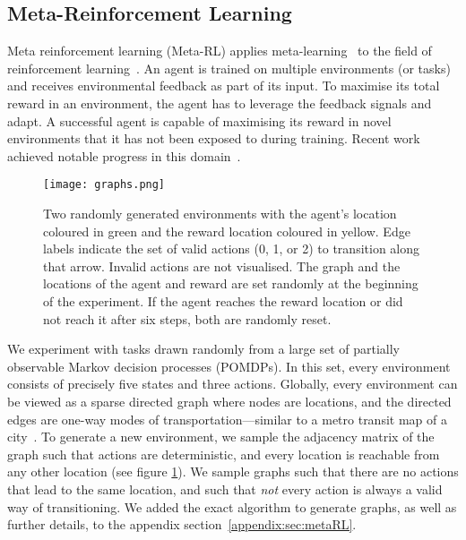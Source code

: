 \documentclass{article} \usepackage{iclr2021_conference,times}
\begin{document}
\subsection{Meta-Reinforcement Learning}
\label{subsec:metaRL}
Meta reinforcement learning (Meta-RL) applies meta-learning~\citep{schmidhuber87,Hochreiter:01meta,finn2017model} to the field of reinforcement learning~\citep{Schmidhuber:94selfold}.
An agent is trained on multiple environments (or tasks) and receives environmental feedback as part of its input. 
To maximise its total reward in an environment, the agent has to leverage the feedback signals and adapt.
A successful agent is capable of maximising its reward in novel environments that it has not been exposed to during training.
Recent work achieved notable progress in this domain~\citep{santoro2016meta,mishra2018a,Kirsch2020Improving}. 
\begin{figure}[h]
  \centering
  \vspace{-10pt}
  \texttt{[image: graphs.png]}
\caption{
Two randomly generated environments with the agent's location coloured in green and the reward location coloured in yellow.
Edge labels indicate the set of valid actions (0, 1, or 2) to transition along that arrow.
Invalid actions are not visualised.
The graph and the locations of the agent and reward are set randomly at the beginning of the experiment.
If the agent reaches the reward location or did not reach it after six steps, both are randomly reset.
}
  \label{fig:graph}
  \vspace{-10pt}
\end{figure}
We experiment with tasks drawn randomly from a large set of partially observable Markov decision processes (POMDPs).
In this set, every environment consists of precisely five states and three actions. 
Globally, every environment can be viewed as a sparse directed graph where nodes are locations, and the directed edges are one-way modes of transportation---similar to a metro transit map of a city~\citep{graves2016}.
To generate a new environment, we sample the adjacency matrix of the graph such that actions are deterministic, and every location is reachable from any other location (see figure \ref{fig:graph}).
We sample graphs such that there are no actions that lead to the same location, and such that \textit{not} every action is always a valid way of transitioning. We added the exact algorithm to generate graphs, as well as further details, to the appendix section~\ref{appendix:sec:metaRL}.
\end{document}
